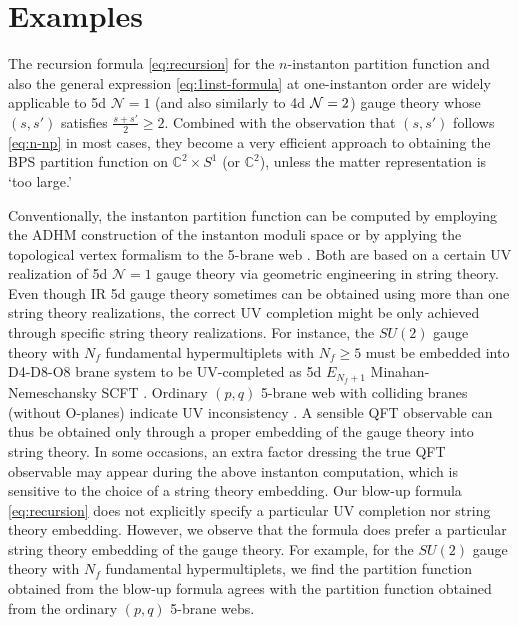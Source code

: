 \documentclass[letterpaper, 11pt]{article}
\def\IC{\mathbb{C}}
\def\CN{{\cal N}}
\begin{document}
{\section{Examples} \label{sec:example}

The recursion formula \eqref{eq:recursion} for the $n$-instanton partition function and also the general expression \eqref{eq:1inst-formula} at one-instanton order are widely applicable to 5d $\mathcal{N}=1$ (and also similarly to 4d $\CN=2$) gauge theory whose $(s,s')$ satisfies $\frac{s+s'}{2}\geq 2$. Combined with the observation that $(s,s')$ follows \eqref{eq:n-np} in most cases, they become a very efficient approach to obtaining the BPS partition function on $\IC^2 \times S^1$ (or $\IC^2$), unless the matter representation is `too large.' 

Conventionally, the instanton partition function can be computed by employing the ADHM construction of the instanton moduli space \cite{Atiyah:1978ri,Nekrasov:2002qd,Nekrasov:2003rj} or by applying the topological vertex formalism to the 5-brane web \cite{Aganagic:2003db,Iqbal:2007ii}. Both are based on a certain UV realization of 5d $\mathcal{N}=1$ gauge theory via geometric engineering in string theory. 
Even though IR 5d gauge theory sometimes can be obtained using more than one string theory realizations, the correct UV completion might be only achieved through specific string theory realizations. For instance, the $SU(2)$ gauge theory with $N_f$ fundamental hypermultiplets with $N_f\geq 5$ must be embedded into D4-D8-O8 brane system to be UV-completed as 5d $E_{N_f+1}$ Minahan-Nemeschansky SCFT \cite{Seiberg:1996bd, Minahan:1996fg, Minahan:1996cj}. Ordinary $(p,q)$ 5-brane web with colliding branes (without O-planes) indicate UV inconsistency \cite{Aharony:1997ju}. 
A sensible QFT observable can thus be obtained only through a proper embedding of the gauge theory into string theory. In some occasions, an extra factor dressing the true QFT observable may appear during the above instanton computation, which is sensitive to the choice of a string theory embedding.
Our blow-up formula \eqref{eq:recursion} does not explicitly specify a particular UV completion nor string theory embedding. However, we observe that the formula does prefer a particular string theory embedding of the gauge theory. For example, for the $SU(2)$ gauge theory with $N_f$ fundamental hypermultiplets, we find the partition function obtained from the blow-up formula agrees with the partition function obtained from the ordinary $(p,q)$ 5-brane webs. 

}
\end{document}
